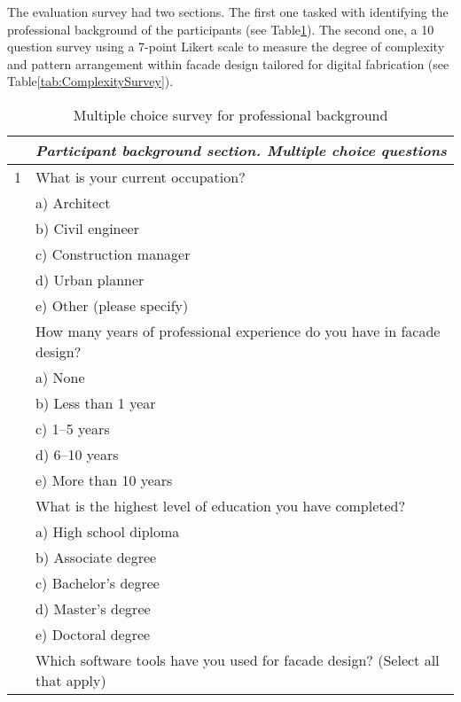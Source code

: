 The evaluation survey had two sections.
The first one tasked with identifying the professional background of the participants (see Table\ref{tab:BackgroundSurvey}).
The second one, a 10 question survey using a 7-point Likert scale to measure the degree of complexity and pattern arrangement within facade design  tailored for digital fabrication (see Table\ref{tab:ComplexitySurvey}).

    \begin{table}[htb]
        \centering
        \footnotesize
        \caption{Multiple choice survey for professional background}
        \label{tab:BackgroundSurvey}
        \begin{tabularx}{\linewidth}{p{0.125cm}X}
            \toprule
            & \textit{Participant background section. Multiple choice questions} \\
            \midrule
            1 & What is your current occupation? \\
            & a) Architect \\
            & b) Civil engineer \\
            & c) Construction manager \\
            & d) Urban planner \\
            & e) Other (please specify) \\
            \addlinespace
            2 & How many years of professional experience do you have in facade design? \\
            & a) None \\
            & b) Less than 1 year \\
            & c) 1--5 years \\
            & d) 6--10 years \\
            & e) More than 10 years \\
            \addlinespace
            3 & What is the highest level of education you have completed? \\
            & a) High school diploma \\
            & b) Associate degree \\
            & c) Bachelor's degree \\
            & d) Master's degree \\
            & e) Doctoral degree \\
            \addlinespace
            4 & Which software tools have you used for facade design? (Select all that apply) \\

\end{tabularx}
\end{table}
